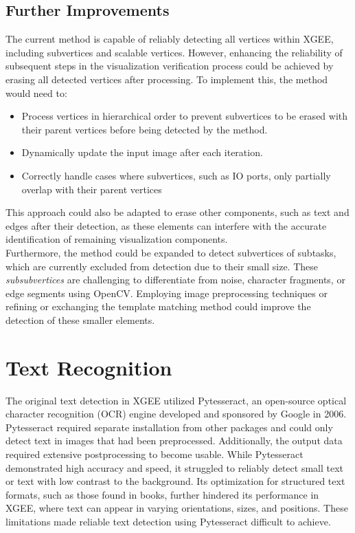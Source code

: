 \subsection{Further Improvements}
The current method is capable of reliably detecting all vertices within XGEE, including subvertices and scalable vertices. However, enhancing the reliability of subsequent steps in the visualization verification process could be achieved by erasing all detected vertices after processing. To implement this, the method would need to:
\begin{itemize}
    \item Process vertices in hierarchical order to prevent subvertices to be erased with their parent vertices before being detected by the method.
    \item Dynamically update the input image after each iteration.
    \item Correctly handle cases where subvertices, such as IO ports, only partially overlap with their parent vertices
\end{itemize}
This approach could also be adapted to erase other components, such as text and edges after their detection, as these elements can interfere with the accurate identification of remaining visualization components.\\
Furthermore, the method could be expanded to detect subvertices of subtasks, which are currently excluded from detection due to their small size. These \textit{subsubvertices} are challenging to differentiate from noise, character fragments, or edge segments using OpenCV. Employing image preprocessing techniques or refining or exchanging the template matching method could improve the detection of these smaller elements.

\section{Text Recognition}
The original text detection in XGEE utilized Pytesseract, an open-source optical character recognition (OCR) engine developed and sponsored by Google in 2006. Pytesseract required separate installation from other packages and could only detect text in images that had been preprocessed. Additionally, the output data required extensive postprocessing to become usable. While Pytesseract demonstrated high accuracy and speed, it struggled to reliably detect small text or text with low contrast to the background. Its optimization for structured text formats, such as those found in books, further hindered its performance in XGEE, where text can appear in varying orientations, sizes, and positions. These limitations made reliable text detection using Pytesseract difficult to achieve.

